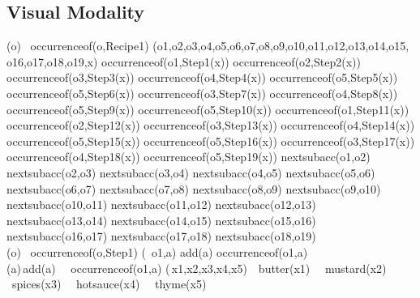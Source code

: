 \subsection{Visual Modality}
\begin{center}

(\forall o) \ occurrence\textunderscore of(o,Recipe1) \supset (\exists o1,o2,o3,o4,o5,o6,o7,o8,o9,o10,o11,o12,o13,o14,o15,\\ o16,o17,o18,o19,x) \land occurrence\textunderscore of(o1,Step1(x)) \land occurrence\textunderscore of(o2,Step2(x)) \land occurrence\textunderscore of(o3,Step3(x)) \land occurrence\textunderscore of(o4,Step4(x)) \land occurrence\textunderscore of(o5,Step5(x)) \land occurrence\textunderscore of(o5,Step6(x)) \land occurrence\textunderscore of(o3,Step7(x)) \land occurrence\textunderscore of(o4,Step8(x)) \land occurrence\textunderscore of(o5,Step9(x)) \land occurrence\textunderscore of(o5,Step10(x)) \land occurrence\textunderscore of(o1,Step11(x)) \land occurrence\textunderscore of(o2,Step12(x)) \land occurrence\textunderscore of(o3,Step13(x)) \land occurrence\textunderscore of(o4,Step14(x)) \land occurrence\textunderscore of(o5,Step15(x)) \land occurrence\textunderscore of(o5,Step16(x)) \land occurrence\textunderscore of(o3,Step17(x)) \land occurrence\textunderscore of(o4,Step18(x)) \land occurrence\textunderscore of(o5,Step19(x)) \land
next\textunderscore subacc(o1,o2) \land next\textunderscore subacc(o2,o3) \land next\textunderscore subacc(o3,o4) \land next\textunderscore subacc(o4,o5) \land
next\textunderscore subacc(o5,o6) \land next\textunderscore subacc(o6,o7) \land next\textunderscore subacc(o7,o8) \land next\textunderscore subacc(o8,o9) \land next\textunderscore subacc(o9,o10) \land next\textunderscore subacc(o10,o11) \land next\textunderscore subacc(o11,o12) \land
next\textunderscore subacc(o12,o13) \land next\textunderscore subacc(o13,o14) \land next\textunderscore subacc(o14,o15) \land next\textunderscore subacc(o15,o16) \land next\textunderscore subacc(o16,o17) \land next\textunderscore subacc(o17,o18) \land next\textunderscore subacc(o18,o19) \\ 

(\forall o) \ occurrence\textunderscore of(o,Step1) \supset (\exists\, o1,a) \land add(a) \land occurrence\textunderscore of(o1,a) \\

(\forall a)\,add(a) \  \land \  occurrence\textunderscore of(o1,a) \supset (\exists\,x1,x2,x3,x4,x5)\  \ butter(x1) \ \land \  mustard(x2) \land \ spices(x3) \   \land \ hotsauce(x4)  \  \land \  thyme(x5) \\


\end{center}
